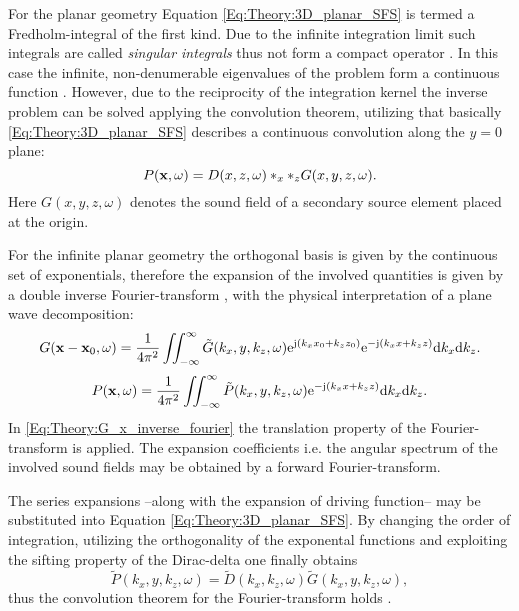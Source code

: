 For the planar geometry Equation \eqref{Eq:Theory:3D_planar_SFS} is termed a Fredholm-integral of the first kind. Due to the infinite integration limit such integrals are called \emph{singular integrals} thus not form a compact operator \cite[p.~921.]{MorseFeshbach1953}. 
In this case the infinite, non-denumerable eigenvalues of the problem form a continuous function \cite{MorseFeshbach1953,Schultz2014:Comparing_approaches}.
However, due to the reciprocity of the integration kernel the inverse problem can be solved applying the convolution theorem, utilizing that basically \eqref{Eq:Theory:3D_planar_SFS} describes a continuous convolution along the $y=0$ plane:
\begin{equation}
P(\mathbf{x},\omega) = D(x,z,\omega)\ast_{x} \ast_{z} G(x,y,z,\omega).
\end{equation}
Here $G(x,y,z,\omega)$ denotes the sound field of a secondary source element placed at the origin.

For the infinite planar geometry the orthogonal basis is given by the continuous set of exponentials, therefore the expansion of the involved quantities is given by a double inverse Fourier-transform \cite{Ahrens2012, Arfken2005,Schultz2014:Comparing_approaches}, with the physical interpretation of a plane wave decomposition:
\begin{equation}
G(\mathbf{x} - \mathbf{x}_0,\omega) = \frac{1}{4\pi^2} \iint_{-\infty}^{\infty} \tilde{G}(k_x,y,k_z, \omega)  \mathrm{e}^{\mathrm{j} (k_x x_0 + k_z z_0)} \mathrm{e}^{-\mathrm{j} (k_x x + k_z z)} \mathrm{d} k_x \mathrm{d} k_z.
\label{Eq:Theory:G_x_inverse_fourier}
\end{equation}
\begin{equation}
P(\mathbf{x},\omega) = \frac{1}{4\pi^2} \iint_{-\infty}^{\infty} \tilde{P}(k_x,y,k_z, \omega) \mathrm{e}^{-\mathrm{j} (k_x x + k_z z)} \mathrm{d} k_x \mathrm{d} k_z.
\end{equation}
In \eqref{Eq:Theory:G_x_inverse_fourier} the translation property of the Fourier-transform is applied.
The expansion coefficients i.e. the angular spectrum of the involved sound fields may be obtained by a forward Fourier-transform.

The series expansions --along with the expansion of driving function-- may be substituted into Equation \eqref{Eq:Theory:3D_planar_SFS}. By changing the order of integration, utilizing the orthogonality of the exponental functions and exploiting the sifting property of the Dirac-delta one finally obtains
\begin{equation}
\tilde{P}(k_x,y,k_z, \omega) = \tilde{D}(k_x,k_z, \omega)  \tilde{G}(k_x,y,k_z, \omega),
\end{equation}
thus the convolution theorem for the Fourier-transform holds \cite{Girod2001}.


